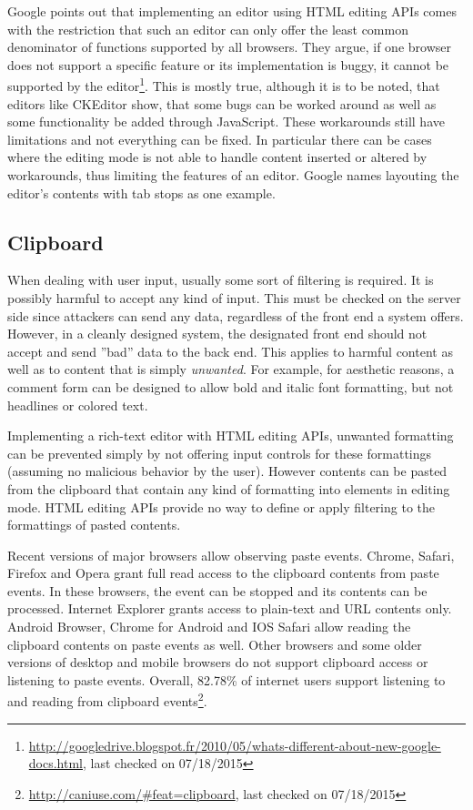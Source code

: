 Google points out that implementing an editor using HTML editing APIs comes with the restriction that such an editor can only offer the least common denominator of functions supported by all browsers. They argue, if one browser does not support a specific feature or its implementation is buggy, it cannot be supported by the editor\footnote{\url{http://googledrive.blogspot.fr/2010/05/whats-different-about-new-google-docs.html}, last checked on 07/18/2015}. This is mostly true, although it is to be noted, that editors like CKEditor show, that some bugs can be worked around as well as some functionality be added through JavaScript. These workarounds still have limitations and not everything can be fixed. In particular there can be cases where the editing mode is not able to handle content inserted or altered by workarounds, thus limiting the features of an editor. Google names layouting the editor's  contents with tab stops as one example.

\subsection{Clipboard}
\label{subsec:editing_disadvantages_clipboard}

When dealing with user input, usually some sort of filtering is required. It is possibly harmful to accept any kind of input. This must be checked on the server side since attackers can send any data, regardless of the front end a system offers. However, in a cleanly designed system, the designated front end should not accept and send ''bad'' data to the back end. This applies to harmful content as well as to content that is simply \textit{unwanted}. For example, for aesthetic reasons, a comment form can be designed to allow bold and italic font formatting, but not headlines or colored text.

Implementing a rich-text editor with HTML editing APIs, unwanted formatting can be prevented simply by not offering input controls for these formattings (assuming no malicious behavior by the user). However contents can be pasted from the clipboard that contain any kind of formatting into elements in editing mode. HTML editing APIs provide no way to define or apply filtering to the formattings of pasted contents.

Recent versions of major browsers allow observing paste events. Chrome, Safari, Firefox and Opera grant full read access to the clipboard contents from paste events. In these browsers, the event can be stopped and its contents can be processed. Internet Explorer grants access to plain-text and URL contents only. Android Browser, Chrome for Android and IOS Safari allow reading the clipboard contents on paste events as well. Other browsers and some older versions of desktop and mobile browsers do not support clipboard access or listening to paste events. Overall, 82.78\% of internet users support listening to and reading from clipboard events\footnote{\url{http://caniuse.com/\#feat=clipboard}, last checked on 07/18/2015}.

